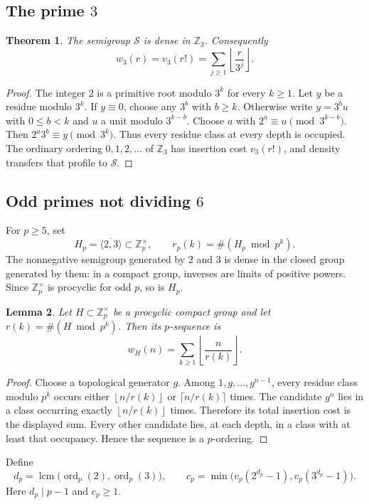 \documentclass[11pt]{article}
\newtheorem{theorem}{Theorem}[section]
\newtheorem{lemma}[theorem]{Lemma}
\theoremstyle{definition}
\theoremstyle{remark}
\newcommand{\Z}{\mathbb Z}
\newcommand{\ord}{\operatorname{ord}}
\newcommand{\lcm}{\operatorname{lcm}}
\newcommand{\calS}{\mathcal S}
\newcommand{\floor}[1]{\left\lfloor #1\right\rfloor}
\begin{document}
\subsection{The prime $3$}
\begin{theorem}\label{thm:p3}
The semigroup $\calS$ is dense in $\Z_3$.  Consequently
\[
        w_3(r)=v_3(r!)=\sum_{j\ge1}\floor{\frac r{3^j}}.
\]
\end{theorem}
\begin{proof}
The integer $2$ is a primitive root modulo $3^k$ for every $k\ge1$.  Let $y$ be a residue modulo $3^k$.  If $y\equiv0$, choose any $3^b$ with $b\ge k$.  Otherwise write $y=3^b u$ with $0\le b<k$ and $u$ a unit modulo $3^{k-b}$.  Choose $a$ with $2^a\equiv u\pmod{3^{k-b}}$.  Then $2^a3^b\equiv y\pmod{3^k}$.  Thus every residue class at every depth is occupied.  The ordinary ordering $0,1,2,\dots$ of $\Z_3$ has insertion cost $v_3(r!)$, and density transfers that profile to $\calS$.
\end{proof}

\subsection{Odd primes not dividing $6$}
For $p\ge5$, set
\[
 H_p=\overline{\langle2,3\rangle}\subset\Z_p^\times,
 \qquad r_p(k)=\#(H_p\bmod p^k).
\]
The nonnegative semigroup generated by $2$ and $3$ is dense in the closed group generated by them: in a compact group, inverses are limits of positive powers.  Since $\Z_p^\times$ is procyclic for odd $p$, so is $H_p$.

\begin{lemma}\label{lem:procyclic-profile}
Let $H\subset\Z_p^\times$ be a procyclic compact group and let
$r(k)=\#(H\bmod p^k)$.  Then its $p$-sequence is
\[
       w_H(n)=\sum_{k\ge1}\floor{\frac n{r(k)}}.
\]
\end{lemma}
\begin{proof}
Choose a topological generator $g$.  Among $1,g,\dots,g^{n-1}$, every residue class modulo $p^k$ occurs either $\floor{n/r(k)}$ or $\lceil{n/r(k)}\rceil$ times.  The candidate $g^n$ lies in a class occurring exactly $\floor{n/r(k)}$ times.  Therefore its total insertion cost is the displayed sum.  Every other candidate lies, at each depth, in a class with at least that occupancy.  Hence the sequence is a $p$-ordering.
\end{proof}

Define
\begin{equation}\label{eq:dp-cp}
 d_p=\lcm\bigl(\ord_p(2),\ord_p(3)\bigr),
 \qquad
 c_p=\min\bigl(v_p(2^{d_p}-1),v_p(3^{d_p}-1)\bigr).
\end{equation}
Here $d_p\mid p-1$ and $c_p\ge1$.
\end{document}
